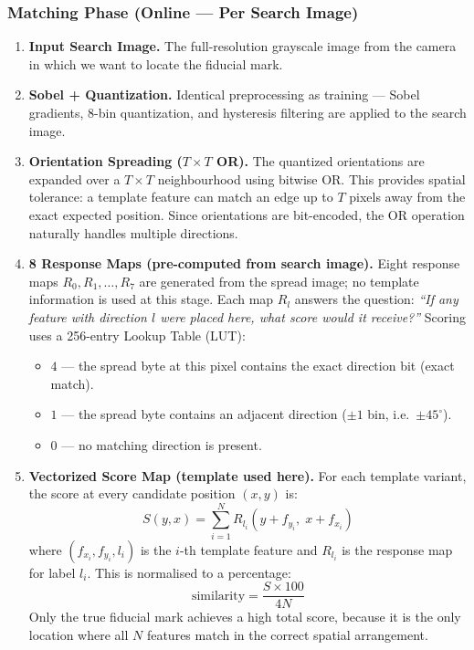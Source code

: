 \documentclass[12pt,a4paper]{article}
\begin{document}
\subsubsection{Matching Phase (Online --- Per Search Image)}
\begin{enumerate}
  \item \textbf{Input Search Image.}  The full-resolution grayscale image from the
        camera in which we want to locate the fiducial mark.

  \item \textbf{Sobel + Quantization.}  Identical preprocessing as training ---
        Sobel gradients, 8-bin quantization, and hysteresis filtering are applied to
        the search image.

  \item \textbf{Orientation Spreading ($T \times T$ OR).}  The quantized
        orientations are expanded over a $T \times T$ neighbourhood using bitwise OR.
        This provides spatial tolerance: a template feature can match an edge up to
        $T$ pixels away from the exact expected position.  Since orientations are
        bit-encoded, the OR operation naturally handles multiple directions.

  \item \textbf{8 Response Maps (pre-computed from search image).}  Eight response
        maps $R_0, R_1, \ldots, R_7$ are generated from the spread image; no
        template information is used at this stage.  Each map $R_l$ answers the
        question: \emph{``If any feature with direction $l$ were placed here, what
        score would it receive?''}  Scoring uses a 256-entry Lookup Table (LUT):
        \begin{itemize}
          \item $4$ --- the spread byte at this pixel contains the exact direction
                bit (exact match).
          \item $1$ --- the spread byte contains an adjacent direction
                ($\pm 1$ bin, i.e.\ $\pm 45^\circ$).
          \item $0$ --- no matching direction is present.
        \end{itemize}

  \item \textbf{Vectorized Score Map (template used here).}  For each template
        variant, the score at every candidate position $(x,y)$ is:
        \begin{equation}
          S(y,x) = \sum_{i=1}^{N} R_{l_i}(y + f_{y_i},\; x + f_{x_i})
          \label{eq:score}
        \end{equation}
        where $(f_{x_i}, f_{y_i}, l_i)$ is the $i$-th template feature and $R_{l_i}$
        is the response map for label $l_i$.  This is normalised to a percentage:
        \begin{equation}
          \text{similarity} = \frac{S \times 100}{4N}
        \end{equation}
        Only the true fiducial mark achieves a high total score, because it is the
        only location where all $N$ features match in the correct spatial arrangement.


\end{enumerate}
\end{document}
